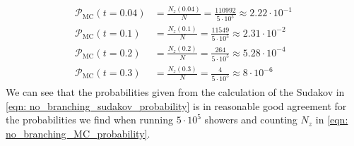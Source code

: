 \documentclass[main.tex]{subfiles}
\begin{document}
\begin{align}\label{eqn: no_branching_MC_probability}
    \begin{split}
        \mathcal{P}_{\text{MC}}(t=0.04) &= \frac{N_z(0.04)}{N} = \frac{110992}{5\cdot 10^{5}} \approx 2.22\cdot 10^{-1} \\
        \mathcal{P}_{\text{MC}}(t=0.1) &= \frac{N_z(0.1)}{N} = \frac{11549}{5\cdot 10^{5}} \approx 2.31\cdot 10^{-2} \\
        \mathcal{P}_{\text{MC}}(t=0.2) &= \frac{N_z(0.2)}{N} = \frac{264}{5\cdot 10^{5}} \approx 5.28\cdot 10^{-4} \\
        \mathcal{P}_{\text{MC}}(t=0.3) &= \frac{N_z(0.3)}{N} = \frac{4}{5\cdot 10^{5}} \approx 8\cdot 10^{-6}
    \end{split}
\end{align}
We can see that the probabilities given from the calculation of the Sudakov in \autoref{eqn: no_branching_sudakov_probability} is in reasonable good agreement for the probabilities we find when running \(5\cdot 10^5\) showers and counting \(N_z\) in \autoref{eqn: no_branching_MC_probability}. 
\end{document}
